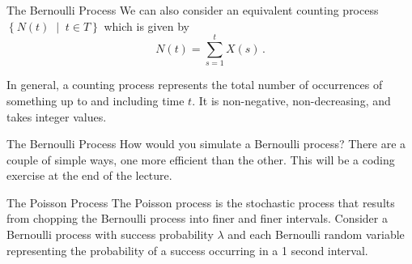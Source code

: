 \documentclass[10pt]{beamer}
\begin{document}
\begin{frame}[fragile]{The Bernoulli Process}
We can also consider an equivalent counting process \(\left\{N\left(t\right) \;\middle|\; t \in T\right\}\) which is given by
\begin{equation*}
    N\left(t\right) = \sum_{s = 1}^t X\left(s\right)\,.
\end{equation*}

In general, a counting process represents the total number of occurrences of something up to and including time \(t\). It is non-negative, non-decreasing, and takes integer values.
\end{frame}

\begin{frame}[fragile]{The Bernoulli Process}
How would you simulate a Bernoulli process? There are a couple of simple ways, one more efficient than the other. This will be a coding exercise at the end of the lecture.
\end{frame}

\begin{frame}[fragile]{The Poisson Process}
The Poisson process is the stochastic process that results from chopping the Bernoulli process into finer and finer intervals. Consider a Bernoulli process with success probability \(\lambda\) and each Bernoulli random variable representing the probability of a success occurring in a 1 second interval.
\end{frame}
\end{document}
